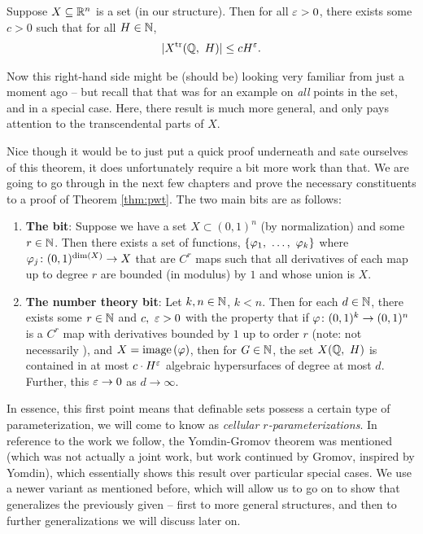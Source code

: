  \begin{theorem}
    Suppose $\XRn[X]{n}$ is a  set (in our \om structure). Then for all $\eps > 0$, there exists some $c > 0$ such that for all $H \in \N$,
      \begin{align*}
        \card{\XtrQH[H]} \leq \bound[H].
      \end{align*}
      \label{thm:pwt}
  \end{theorem}

  Now this right-hand side might be (should be) looking very familiar from just a moment ago -- but recall that that was for an example on \emph{all} points in the set, and in a special case. Here, there result is much more general, and only pays attention to the transcendental parts of $X$.

  Nice though it would be to just put a quick proof underneath and sate ourselves of this theorem, it does unfortunately require a bit more work than that. We are going to go through in the next few chapters and prove the necessary constituents to a proof of Theorem \ref{thm:pwt}. The two main bits are as follows:
  \begin{enumerate}

    \item \textbf{The \om bit}: Suppose we have a  set $X \subset (0, 1)^n$ (by normalization) and some $r \in \N$. Then there exists a set of functions, $\{ \vonevm{\phi}{k} \}$ where $\funcdom{\phi_j}{(0, 1)^{\dim{X}}}{X}$ that are $C^r$  maps such that all derivatives of each map up to degree $r$ are bounded (in modulus) by $1$ and whose union is $X$.
    \label{pw_proof:pt1}

    \item \textbf{The number theory bit}: Let $k, n \in \N$, $k < n$. Then for each $d \in \N$, there exists some $r \in \N$ and $c, \ \eps > 0$ with the property that if $\funcdom{\phi}{(0, 1)^k}{(0, 1)^n}$ is a $C^r$ map with derivatives bounded by $1$ up to order $r$ (note: not necessarily ), and $X = \image{\phi}$, then for $G \in \N$, the set $\XQH[H]$ is contained in at most $c \cdot H^{\eps}$ algebraic hypersurfaces of degree at most $d$. Further, this $\eps \to 0$ as $d \to \infty$.
    \label{pw_proof:pt2}

  \end{enumerate}

In essence, this first point means that definable sets possess a certain type of parameterization, we will come to know as \emph{cellular $r$-parameterizations}. In reference to the work we follow, the Yomdin-Gromov theorem was mentioned (which was not actually a joint work, but work continued by Gromov, inspired by Yomdin), which essentially shows this result over particular special cases. We use a newer variant as mentioned before, which will allow us to go on to show that \pw generalizes the previously given -- first to more general \om structures, and then to further generalizations we will discuss later on.

